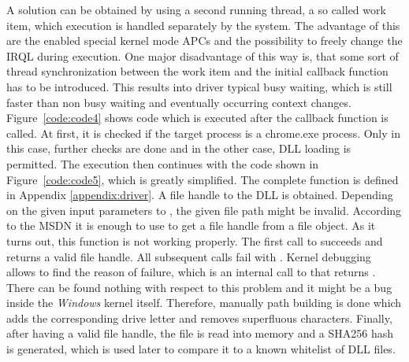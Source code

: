 A solution can be obtained by using a second running thread, a so called work item, which execution is handled separately by the system. The advantage of this are the enabled special kernel mode \glspl{APC} and the possibility to freely change the \gls{IRQL} during execution. One major disadvantage of this way is, that some sort of thread synchronization between the work item and the initial callback function has to be introduced. This results into driver typical busy waiting, which is still faster than non busy waiting and eventually occurring context changes. Figure~\ref{code:code4} shows code which is executed after the callback function is called. At first, it is checked if the target process is a chrome.exe process. Only in this case, further checks are done and in the other case, \gls{DLL} loading is permitted. The execution then continues with the code shown in Figure~\ref{code:code5}, which is greatly simplified. The complete function is defined in Appendix \ref{appendix:driver}. A file handle to the \gls{DLL} is obtained. Depending on the given input parameters to , the given file path might be invalid. According to the \gls{MSDN} it is enough to use  to get a file handle from a file object. As it turns out, this function is not working properly. The first call to  succeeds and returns a valid file handle. All subsequent calls fail with . Kernel debugging allows to find the reason of failure, which is an internal call to  that returns . There can be found nothing with respect to this problem and it might be a bug inside the \emph{Windows} kernel itself. Therefore, manually path building is done which adds the corresponding drive letter and removes superfluous characters. Finally, after having a valid file handle, the file is read into memory and a SHA256 \cite{eckert2014sicherheit} hash is generated, which is used later to compare it to a known whitelist of \gls{DLL} files.

